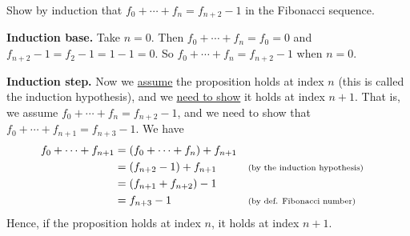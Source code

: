 \documentclass[10pt]{beamer}
\begin{document}
\begin{frame}

\begin{mygreenbox}[title=Exercise 2]
Show by induction that $f_0 + \cdots + f_n = f_{n+2} -1$ in the Fibonacci sequence.	
\end{mygreenbox}

\vfill \vfill 
\begin{myyellowbox}[title=Solution]
\textbf{Induction base.} Take $n=0$.  Then $f_0 + \cdots + f_n = f_0 =0$ and $f_{n+2} -1 = f_2 -1 = 1-1 = 0$. So $f_0 + \cdots + f_n = f_{n+2} -1$ when $n=0$.

\vspace{0.25cm}

\textbf{Induction step.} Now we \underline{assume} the proposition holds at index $n$ (this is called the \alert{induction hypothesis}), and we \underline{need to show} it holds at index $n+1$.  That is, we assume $f_0 + \cdots + f_n = f_{n+2} -1$, and we need to show that $f_0 + \cdots + f_{n+1} = f_{n+3} -1$.  We have
%
\begin{align*}
f_0 + \cdots + f_{n+1} &= (f_0 + \cdots + f_n) + f_{n+1} \\
&=(f_{n+2} -1) + f_{n+1} && \text{\scriptsize{{(by the induction hypothesis)}}} \\
&= (f_{n+1}+f_{n+2}) -1  && \\
&= f_{n+3} -1  && \text{\scriptsize{{(by def. Fibonacci number)}}}	
\end{align*}
Hence, if the proposition holds at index $n$, it holds at index $n+1$.
\end{myyellowbox}
	
\end{frame}
\end{document}
